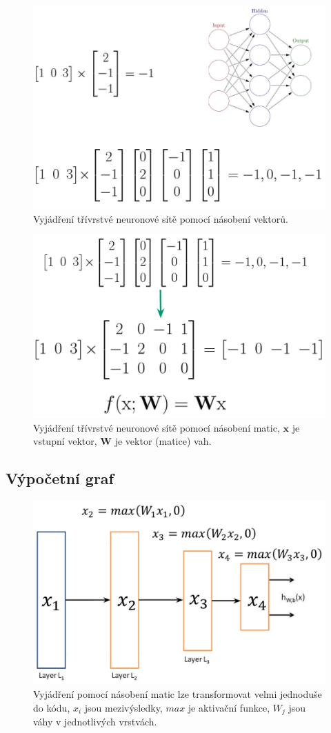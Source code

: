 \begin{figure}[H]
    \centering
    \includegraphics[width=0.65\linewidth]{nn_matrix_2.pdf}
    \caption{Vyjádření třívrstvé neuronové sítě pomocí násobení vektorů.}
\end{figure}

\begin{figure}[H]
    \centering
    \includegraphics[width=0.65\linewidth]{nn_matrix_3.pdf}
    \caption{Vyjádření třívrstvé neuronové sítě pomocí násobení matic, $\mathbf{x}$ je vstupní vektor, $\mathbf{W}$ je vektor (matice) vah.}
\end{figure}

\subsection{Výpočetní graf}

\begin{figure}[H]
    \centering
    \includegraphics[width=0.65\linewidth]{nn_code.pdf}
    \caption{Vyjádření pomocí násobení matic lze transformovat velmi jednoduše do kódu, $x_i$ jsou mezivýsledky, $max$ je aktivační funkce, $W_j$ jsou váhy v jednotlivých vrstvách.}
\end{figure}

